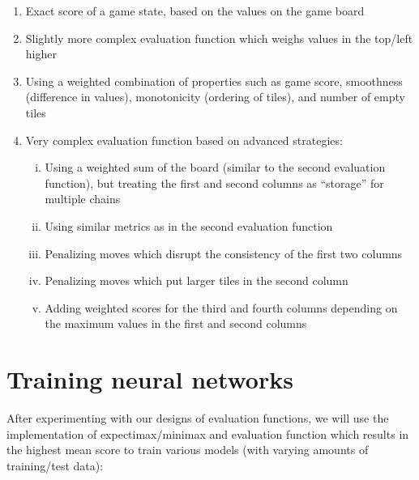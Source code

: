 \documentclass[11pt]{article}
\begin{document}
\begin{enumerate}[1)]

\item Exact score of a game state, based on the values on the game board

\item Slightly more complex evaluation function which weighs values in the top/left higher

\item Using a weighted combination of properties such as game score, smoothness (difference in values), monotonicity (ordering of tiles), and number of empty tiles

\item Very complex evaluation function based on advanced strategies:

\begin{enumerate}[i)]

\item Using a weighted sum of the board (similar to the second evaluation function), but treating the first and second columns as “storage” for multiple chains

\item Using similar metrics as in the second evaluation function

\item Penalizing moves which disrupt the consistency of the first two columns

\item Penalizing moves which put larger tiles in the second column

\item Adding weighted scores for the third and fourth columns depending on the maximum values in the first and second columns

\end{enumerate}

\end{enumerate}

\section{Training neural networks}

After experimenting with our designs of evaluation functions, we will use the implementation of expectimax/minimax and evaluation function which results in the highest mean score to train various models (with varying amounts of training/test data):
\end{document}
